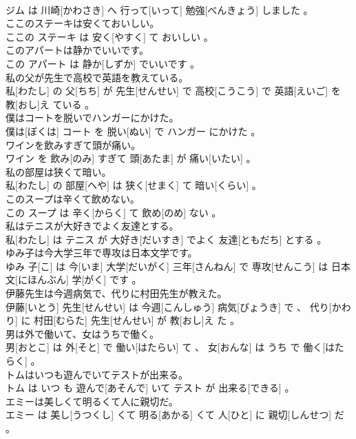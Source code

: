 \documentclass[8pt]{extreport}
\begin{document}
\begin{CJK}{UTF8}{min}
\\	ジム は 川崎[かわさき] へ 行って[いって] 勉強[べんきょう] しました 。
\\	ここのステーキは安くておいしい。	
\\	ここの ステーキ は 安く[やすく] て おいしい 。
\\	このアパートは静かでいいです。	
\\	この アパート は 静か[しずか] でいいです 。
\\	私の父が先生で高校で英語を教えている。	
\\	私[わたし] の 父[ちち] が 先生[せんせい] で 高校[こうこう] で 英語[えいご] を 教[おし]え ている 。
\\	僕はコートを脱いでハンガーにかけた。	
\\	僕は[ぼくは] コート を 脱い[ぬい] で ハンガー にかけた 。
\\	ワインを飲みすぎて頭が痛い。	
\\	ワイン を 飲み[のみ] すぎて 頭[あたま] が 痛い[いたい] 。
\\	私の部屋は狭くて暗い。	
\\	私[わたし] の 部屋[へや] は 狭く[せまく] て 暗い[くらい] 。
\\	このスープは辛くて飲めない。	
\\	この スープ は 辛く[からく] て 飲め[のめ] ない 。
\\	私はテニスが大好きでよく友達とする。	
\\	私[わたし] は テニス が 大好き[だいすき] でよく 友達[ともだち] とする 。
\\	ゆみ子は今大学三年で専攻は日本文学です。	
\\	ゆみ 子[こ] は 今[いま] 大学[だいがく] 三年[さんねん] で 専攻[せんこう] は 日本文[にほんぶん] 学[がく] です 。
\\	伊藤先生は今週病気で、代りに村田先生が教えた。	
\\	伊藤[いとう] 先生[せんせい] は 今週[こんしゅう] 病気[びょうき] で 、 代り[かわり] に 村田[むらた] 先生[せんせい] が 教[おし]え た 。
\\	男は外で働いて、女はうちで働く。	
\\	男[おとこ] は 外[そと] で 働い[はたらい] て 、 女[おんな] は うち で 働く[はたらく] 。
\\	トムはいつも遊んでいてテストが出来る。	
\\	トム は いつ も 遊んで[あそんで] いて テスト が 出来る[できる] 。
\\	エミーは美しくて明るくて人に親切だ。	
\\	エミー は 美し[うつくし] くて 明る[あかる] くて 人[ひと] に 親切[しんせつ] だ 。

\end{CJK}
\end{document}
